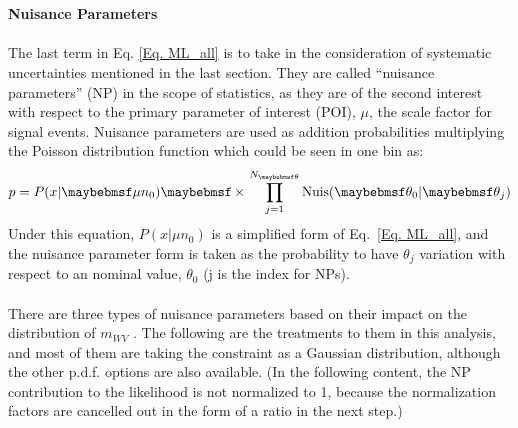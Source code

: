 \\
\\{\bf Nuisance Parameters}
\\
\\The last term in Eq. \ref{Eq. ML_all} is to take in the consideration of systematic uncertainties mentioned in the last section. They are called ``nuisance parameters''  (NP) in the scope of statistics, as they are of the second interest with respect to the primary parameter of interest (POI), $\mu$, the scale factor for signal events. Nuisance parameters are used as addition probabilities multiplying the Poisson distribution function which could be seen in one bin as:
\begin{equation}
p = P(x|\mu n_0)\times\displaystyle\prod_{j=1}^{N_{\theta}}{\rm Nuis}(\theta_0|\theta_j)
\end{equation}
Under this equation, $P(x|\mu n_0)$ is a simplified form of Eq.~\ref{Eq. ML_all}, and the nuisance parameter form is taken as the probability to have $\theta_j$ variation with respect to an nominal value, $\theta_0$ (j is the index for NPs).
\\
\\There are three types of nuisance parameters based on their impact on the distribution of $m_{WV}$ \cite{NuiTreats}. The following are the treatments to them in this analysis, and most of them are taking the constraint as a Gaussian distribution, although the other p.d.f. options are also available. (In the following content, the NP contribution to the likelihood is not normalized to 1, because the normalization factors are cancelled out in the form of a ratio in the next step.)
